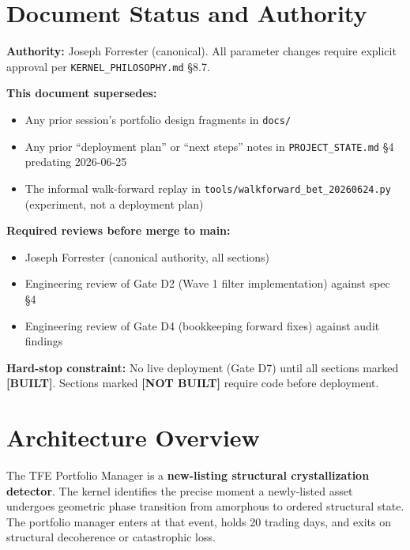\documentclass[11pt,a4paper]{article}
\newcommand{\statusbuilt}{\textcolor{statusbuilt}{\textbf{[BUILT]}}}
\newcommand{\statusnotbuilt}{\textcolor{statusnotbuilt}{\textbf{[NOT BUILT]}}}
\newcommand{\code}[1]{\texttt{\small#1}}
\begin{document}
\section{Document Status and Authority}

\textbf{Authority:} Joseph Forrester (canonical). All parameter changes require explicit approval per \code{KERNEL\_PHILOSOPHY.md} §8.7.

\textbf{This document supersedes:}
\begin{itemize}
  \item Any prior session's portfolio design fragments in \texttt{docs/}
  \item Any prior ``deployment plan'' or ``next steps'' notes in \texttt{PROJECT\_STATE.md} §4 predating 2026-06-25
  \item The informal walk-forward replay in \texttt{tools/walkforward\_bet\_20260624.py} (experiment, not a deployment plan)
\end{itemize}

\textbf{Required reviews before merge to main:}
\begin{itemize}
  \item Joseph Forrester (canonical authority, all sections)
  \item Engineering review of Gate D2 (Wave 1 filter implementation) against spec §4
  \item Engineering review of Gate D4 (bookkeeping forward fixes) against audit findings
\end{itemize}

\begin{warningbox}
\textbf{Hard-stop constraint:} No live deployment (Gate D7) until all sections marked \statusbuilt. Sections marked \statusnotbuilt{} require code before deployment.
\end{warningbox}

\section{Architecture Overview}

The TFE Portfolio Manager is a \textbf{new-listing structural crystallization detector}. The kernel identifies the precise moment a newly-listed asset undergoes geometric phase transition from amorphous to ordered structural state. The portfolio manager enters at that event, holds 20 trading days, and exits on structural decoherence or catastrophic loss.
\end{document}
